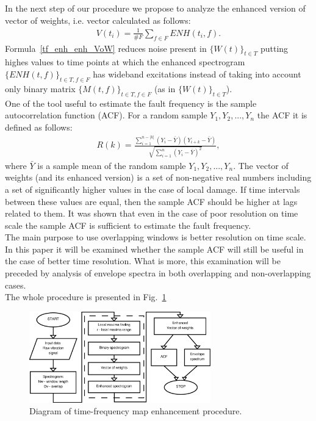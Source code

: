 In the next step of our procedure we propose to analyze the enhanced version of vector of weights, i.e. vector calculated as follows:
\begin{eqnarray}\label{tf_enh_row4}
V(t_i)=\frac{1}{\#F}\sum_{f\in F}ENH(t_i,f).
\label{tf_enh_enh_VoW}\end{eqnarray}
Formula~\ref{tf_enh_enh_VoW} reduces noise present in $\{W(t)\}_{t\in T}$ putting highes values to time points at which the enhanced spectrogram $\{ENH(t,f)\}_{t\in T, f\in F}$ has wideband excitations instead of taking into account only binary matrix $\{M(t,f)\}_{t\in T, f\in F}$ (as in $\{W(t)\}_{t\in T}$).\\
One of the tool useful to estimate the fault frequency is the sample autocorrelation function (ACF). For a random sample $Y_1,Y_2,...,Y_n$ the ACF  it is defined as follows:
\begin{eqnarray}
R(k)=\frac{\sum_{i=1}^{n-|k|}(Y_i-\bar{Y})(Y_{i+k}-\bar{Y})}{\sqrt{\sum_{i=1}^n(Y_i-\bar{Y})^2}},
\end{eqnarray}
where $\bar{Y}$ is a sample mean of the random sample $Y_1,Y_2,...,Y_n$. The vector of weights (and its enhanced version) is a set of non-negative real numbers including a set of significantly higher values in the case of local damage. If time intervals between these values are equal, then the sample ACF should be higher at lags related to them. It was shown that even in the case of poor resolution on time scale the sample ACF is sufficient to estimate the fault frequency.\\
The main purpose to use overlapping windows is better resolution on time scale. In this paper it will be examined whether the sample ACF will still be useful in the case of better time resolution. What is more, this examination will be preceded by analysis of envelope spectra in both overlapping and non-overlapping cases.\\
The whole procedure is presented in Fig.~\ref{tf_enh_fig01}
\begin{figure}[ht]
\begin{center}
\includegraphics[width=0.7\textwidth]{methodology/tf_enh/fig01diagram}
\caption{Diagram of time-frequency map enhancement procedure.}\label{tf_enh_fig01}
\end{center}
\end{figure}
\FloatBarrier